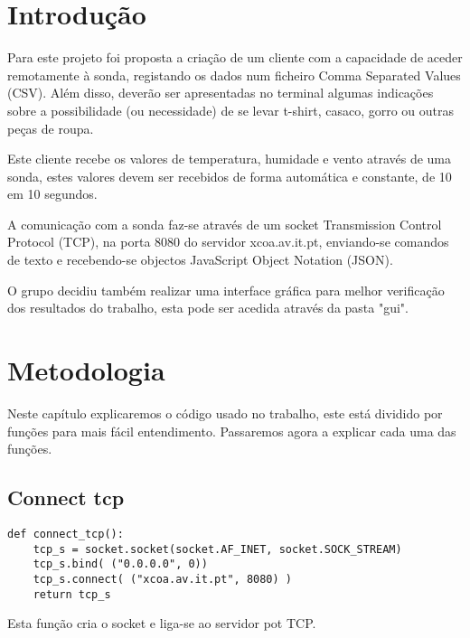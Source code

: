 \documentclass{report}
\begin{document}
\tableofcontents


\clearpage
{}

\chapter{Introdução}
\label{chap.introducao}

Para este projeto foi proposta a criação de um cliente com a capacidade de aceder remotamente à sonda, registando os dados num ficheiro Comma Separated Values (CSV). 
Além disso, deverão ser apresentadas no terminal algumas indicações sobre a possibilidade (ou
necessidade) de se levar t-shirt, casaco, gorro ou outras peças de roupa.

Este cliente recebe os valores de temperatura, humidade e vento através de uma sonda, estes valores devem ser recebidos de forma automática e constante, de 10 em 10 segundos.

A comunicação com a sonda faz-se através de um socket Transmission Control Protocol
(TCP), na porta 8080 do servidor xcoa.av.it.pt, enviando-se comandos de texto
e recebendo-se objectos JavaScript Object Notation (JSON). 

O grupo decidiu também realizar uma interface gráfica para melhor verificação dos resultados do trabalho, esta pode ser acedida através da pasta "gui".



\chapter{Metodologia}
\label{chap.metodologia}
Neste capítulo explicaremos o código usado no trabalho, este está dividido por funções para mais fácil entendimento. Passaremos agora a explicar cada uma das funções.

\section{Connect \textunderscore tcp}
\begin{lstlisting}
def connect_tcp():
	tcp_s = socket.socket(socket.AF_INET, socket.SOCK_STREAM)
	tcp_s.bind( ("0.0.0.0", 0))	
	tcp_s.connect( ("xcoa.av.it.pt", 8080) )
	return tcp_s
\end{lstlisting}

Esta função cria o socket e liga-se ao servidor pot TCP.
\end{document}
